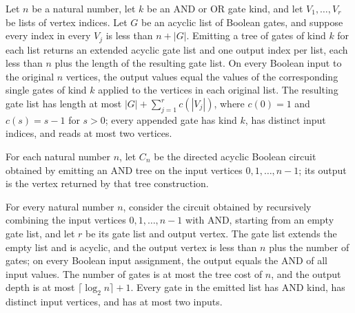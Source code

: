 \begin{theorem}
\label{BoolCircuit.emitTrees_spec}
\leanok
{}
Let $n$ be a natural number, let $k$ be an AND or OR gate kind, and let $V_1,\ldots,V_r$
be lists of vertex indices. Let $G$ be an acyclic list of Boolean gates, and suppose
every index in every $V_j$ is less than $n+|G|$. Emitting a tree of gates of kind $k$
for each list returns an extended acyclic gate list and one output index per list, each
less than $n$ plus the length of the resulting gate list. On every Boolean input to the
original $n$ vertices, the output values equal the values of the corresponding single
gates of kind $k$ applied to the vertices in each original list. The resulting gate list
has length at most $|G|+\sum_{j=1}^r c(|V_j|)$, where $c(0)=1$ and $c(s)=s-1$ for $s>0$;
every appended gate has kind $k$, has distinct input indices, and reads at most two
vertices.
\end{theorem}

\begin{definition}
\label{BoolCircuit.andAllDAG}
\leanok
{}
For each natural number $n$, let $C_n$ be the directed acyclic Boolean circuit obtained
by emitting an AND tree on the input vertices $0,1,\ldots,n-1$; its output is the
vertex returned by that tree construction.
\end{definition}

\begin{theorem}
\label{BoolCircuit.andAllDAG_spec}
\leanok
{}
For every natural number $n$, consider the circuit obtained by recursively combining the
input vertices $0,1,\ldots,n-1$ with AND, starting from an empty gate list, and let $r$
be its gate list and output vertex. The gate list extends the empty list and is acyclic,
and the output vertex is less than $n$ plus the number of gates; on every Boolean input
assignment, the output equals the AND of all input values. The number of gates is at
most the tree cost of $n$, and the output depth is at most $\lceil\log_2 n\rceil+1$.
Every gate in the emitted list has AND kind, has distinct input vertices, and has at
most two inputs.
\end{theorem}


